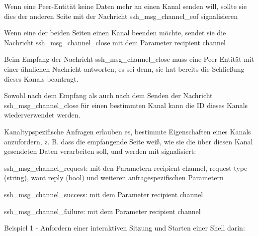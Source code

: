 \documentclass[a4paper]{article}
\begin{document}
\begin{multicols}{3}
\begin{itemize*}
\begin{itemize*}
                  \begin{itemize*}
                        \item Wenn eine Peer-Entität keine Daten mehr an einen Kanal senden will, sollte sie dies der anderen Seite mit der Nachricht ssh\_msg\_channel\_eof signalisieren
                        \item Wenn eine der beiden Seiten einen Kanal beenden möchte, sendet sie die Nachricht ssh\_msg\_channel\_close mit dem Parameter recipient channel
                        \item Beim Empfang der Nachricht ssh\_msg\_channel\_close muss eine Peer-Entität mit einer ähnlichen Nachricht antworten, es sei denn, sie hat bereits die Schließung dieses Kanals beantragt.
                        \item Sowohl nach dem Empfang als auch nach dem Senden der Nachricht ssh\_msg\_channel\_close für einen bestimmten Kanal kann die ID dieses Kanals wiederverwendet werden.
                  \end{itemize*}
                  \item
                  Kanaltypspezifische Anfragen erlauben es, bestimmte Eigenschaften
                  eines Kanals anzufordern, z. B. dass die empfangende Seite weiß, wie
                  sie die über diesen Kanal gesendeten Daten verarbeiten soll, und
                  werden mit signalisiert:

                  \begin{itemize*}
                        \item ssh\_msg\_channel\_request: mit den Parametern recipient channel, request type (string), want reply (bool) und weiteren anfragespezifischen Parametern
                        \item ssh\_msg\_channel\_success: mit dem Parameter recipient channel
                        \item ssh\_msg\_channel\_failure: mit dem Parameter recipient channel
                  \end{itemize*}
                  \item
                  Beispiel 1 - Anfordern einer interaktiven Sitzung und Starten einer
                  Shell darin:


\end{itemize*}
\end{itemize*}
\end{multicols}
\end{document}
